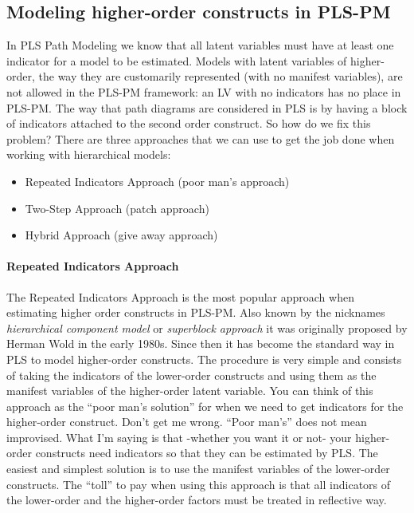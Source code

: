 \documentclass[12pt]{book}\usepackage{graphicx, color}
\begin{document}
\subsection{Modeling higher-order constructs in PLS-PM}
In PLS Path Modeling we know that all latent variables must have at least one indicator for a model to be estimated. Models with latent variables of higher-order, the way they are customarily represented (with no manifest variables), are not allowed in the PLS-PM framework: an LV with no indicators has no place in PLS-PM. The way that path diagrams are considered in PLS is by having a block of indicators attached to the second order construct. So how do we fix this problem? There are three approaches that we can use to get the job done when working with hierarchical models:
\begin{itemize}
 \item Repeated Indicators Approach (poor man's approach)
 \item Two-Step Approach (patch approach)
 \item Hybrid Approach (give away approach)
\end{itemize}

\paragraph{Repeated Indicators Approach} 
The Repeated Indicators Approach is the most popular approach when estimating higher order constructs in PLS-PM. Also known by the nicknames \textit{hierarchical component model} or \textit{superblock approach} it was originally proposed by Herman Wold in the early 1980s. Since then it has become the standard way in PLS to model higher-order constructs. The procedure is very simple and consists of taking the indicators of the lower-order constructs and using them as the manifest variables of the higher-order latent variable. You can think of this approach as the ``poor man's solution'' for when we need to get indicators  for the higher-order construct. Don't get me wrong. ``Poor man's'' does not mean improvised. What I'm saying is that -whether you want it or not- your higher-order constructs need indicators so that they can be estimated by PLS. The easiest and simplest solution is to use the manifest variables of the lower-order constructs. The ``toll'' to pay when using this approach is that all indicators of the lower-order and the higher-order factors must be treated in reflective way.
\end{document}
